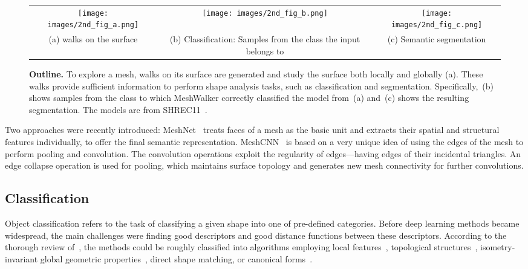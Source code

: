 \documentclass[acmtog]{acmart}
\begin{document}
\begin{figure*}[tb]
\centering 
\begin{tabular}{ccc}
\texttt{[image: images/2nd\_fig\_a.png]} &
\texttt{[image: images/2nd\_fig\_b.png]} &
\texttt{[image: images/2nd\_fig\_c.png]}  \\
(a)  walks on the surface & (b) Classification: Samples from the class the input belongs to& (c) Semantic segmentation
\end{tabular}
\caption{{\bf Outline.}
To explore a mesh, walks on its surface are generated and study the surface both locally and globally (a).
These walks provide sufficient information to perform shape analysis tasks, such as classification and segmentation.
Specifically,~(b) shows samples from the class to which MeshWalker correctly classified the model from~(a) and~(c) shows the resulting segmentation.
The models are from SHREC11~\cite{lian2011shape}.
}
\label{fig:outline} 
\end{figure*}


Two approaches were recently introduced:
MeshNet~\cite{feng2019meshnet} treats faces of a mesh as the basic unit and  extracts their spatial and structural features individually, to offer the final semantic representation.
MeshCNN~\cite{hanocka2019meshcnn} is based on a very unique idea of using the edges of the mesh to perform pooling and convolution. 
The convolution operations exploit the regularity of edges---having  edges of their incidental triangles.
An edge collapse operation is used for pooling, which maintains surface topology and generates new mesh connectivity for further convolutions.

\subsection{Classification}
\label{subsec:related_work_classification}
Object classification refers to the task of classifying a given shape into one of pre-defined categories.
Before deep learning methods became widespread, the main challenges were finding good descriptors and good distance functions between these descriptors.
According to the thorough  review of~\cite{lian2013comparison}, the methods could be roughly classified into algorithms employing local features~\cite{johnson1999using, lowe2004distinctive, liu2006shape, sun2009concise, ovsjanikov2009shape}, topological structures~\cite{hilaga2001topology, sundar2003skeleton, tam2007deformable}, isometry-invariant global geometric properties~\cite{reuter2005laplace, jain2007spectral, mahmoudi2009three}, 
direct shape matching, or canonical forms~\cite{memoli2005theoretical, memoli2007use, bronstein2006efficient, elad2003bending}.
\end{document}
